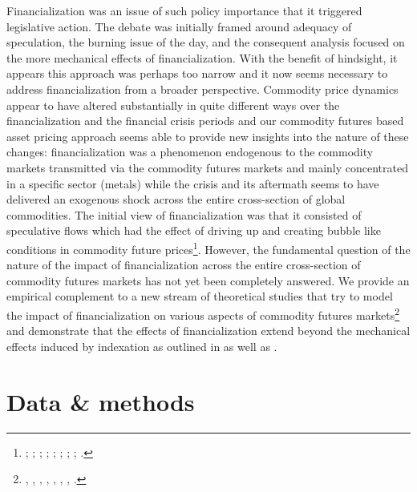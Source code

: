\documentclass[12pt,]{article}
\let\rmarkdownfootnote\footnote%
\def\footnote{\protect\rmarkdownfootnote}
\begin{document}
Financialization was an issue of such policy importance that it
triggered legislative action. The debate was initially framed around
adequacy of speculation, the burning issue of the day, and the
consequent analysis focused on the more mechanical effects of
financialization. With the benefit of hindsight, it appears this
approach was perhaps too narrow and it now seems necessary to address
financialization from a broader perspective. Commodity price dynamics
appear to have altered substantially in quite different ways over the
financialization and the financial crisis periods and our commodity
futures based asset pricing approach seems able to provide new insights
into the nature of these changes: financialization was a phenomenon
endogenous to the commodity markets transmitted via the commodity
futures markets and mainly concentrated in a specific sector (metals)
while the crisis and its aftermath seems to have delivered an exogenous
shock across the entire cross-section of global commodities. The initial
view of financialization was that it consisted of speculative flows
which had the effect of driving up and creating bubble like conditions
in commodity future prices\footnote{\citet{de_schutter_food_2010_1};
  \citet{gilbert_how_2010}; \citet{gilbert_speculative_2010};
  \citet{masters_testimony_2008}; \citet{masters_accidental_2008};
  \citet{herman_not_2011_1}; \citet{schumann_hunger-makers_2011};
  \citet{singleton_investor_2013}; \citet{unctad_global_2009}.}.
However, the fundamental question of the nature of the impact of
financialization across the entire cross-section of commodity futures
markets has not yet been completely answered. We provide an empirical
complement to a new stream of theoretical studies that try to model the
impact of financialization on various aspects of commodity futures
markets\footnote{\citet{etula_broker-dealer_2013},
  \citet{acharya_limits_2013}, \citet{cheng_convective_2014},
  \citet{leclercq_equilibrium_2014}, \citet{sockin_informational_2015},
  \citet{goldstein_speculation_2013},
  \citet{EkelandSpeculationcommodityfutures2016},
  \citet{goldstein_commodity_2017}.} and demonstrate that the effects of
financialization extend beyond the mechanical effects induced by
indexation as outlined in \citet{basak_model_2016} as well as
\citet{tang_index_2012}.

\hypertarget{data-methods}{%
\section{Data \& methods}\label{data-methods}}
\end{document}
